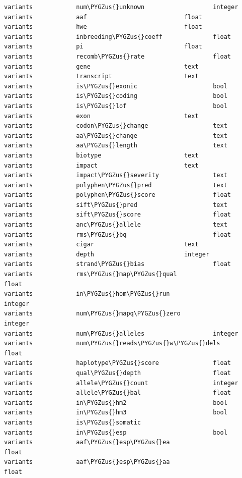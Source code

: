 \documentclass[letterpaper,10pt,english]{sphinxmanual}
\def\PYGZus{\char`\_}
\begin{document}
\begin{Verbatim}[commandchars=\\\{\}]
variants            num\PYGZus{}unknown                   integer
variants            aaf                           float
variants            hwe                           float
variants            inbreeding\PYGZus{}coeff              float
variants            pi                            float
variants            recomb\PYGZus{}rate                   float
variants            gene                          text
variants            transcript                    text
variants            is\PYGZus{}exonic                     bool
variants            is\PYGZus{}coding                     bool
variants            is\PYGZus{}lof                        bool
variants            exon                          text
variants            codon\PYGZus{}change                  text
variants            aa\PYGZus{}change                     text
variants            aa\PYGZus{}length                     text
variants            biotype                       text
variants            impact                        text
variants            impact\PYGZus{}severity               text
variants            polyphen\PYGZus{}pred                 text
variants            polyphen\PYGZus{}score                float
variants            sift\PYGZus{}pred                     text
variants            sift\PYGZus{}score                    float
variants            anc\PYGZus{}allele                    text
variants            rms\PYGZus{}bq                        float
variants            cigar                         text
variants            depth                         integer
variants            strand\PYGZus{}bias                   float
variants            rms\PYGZus{}map\PYGZus{}qual                  float
variants            in\PYGZus{}hom\PYGZus{}run                    integer
variants            num\PYGZus{}mapq\PYGZus{}zero                 integer
variants            num\PYGZus{}alleles                   integer
variants            num\PYGZus{}reads\PYGZus{}w\PYGZus{}dels              float
variants            haplotype\PYGZus{}score               float
variants            qual\PYGZus{}depth                    float
variants            allele\PYGZus{}count                  integer
variants            allele\PYGZus{}bal                    float
variants            in\PYGZus{}hm2                        bool
variants            in\PYGZus{}hm3                        bool
variants            is\PYGZus{}somatic
variants            in\PYGZus{}esp                        bool
variants            aaf\PYGZus{}esp\PYGZus{}ea                    float
variants            aaf\PYGZus{}esp\PYGZus{}aa                    float

\end{Verbatim}
\end{document}
